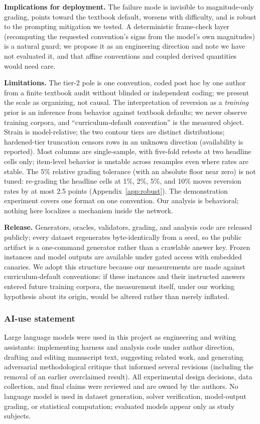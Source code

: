 \documentclass{article}
\begin{document}
\textbf{Implications for deployment.} The failure mode is invisible to magnitude-only grading, points toward the textbook
default, worsens with difficulty, and is robust to the prompting mitigation we
tested. A deterministic frame-check layer
(recomputing the requested convention's signs from the model's own magnitudes)
is a natural guard; we propose it as an engineering direction and note we have
not evaluated it, and that affine conventions and coupled derived quantities
would need care.

\textbf{Limitations.} The tier-2 pole is one convention, coded post hoc by one
author from a finite textbook audit without blinded or independent coding; we
present the scale as organizing, not causal. The interpretation of reversion as
a \emph{training} prior is an inference from behavior against textbook defaults;
we never observe training corpora, and ``curriculum-default convention'' is the
measured object. Strain is model-relative; the two contour tiers are distinct
distributions; hardened-tier truncation censors rows in an unknown direction
(availability is reported). Most columns are single-sample, with five-fold retests at two headline cells only;
item-level behavior is unstable across resamples even where rates are stable. The
5\% relative grading tolerance (with an absolute floor near zero) is not tuned:
re-grading the headline cells at 1\%, 2\%, 5\%, and 10\% moves reversion rates by
at most 2.5 points (Appendix~\ref{app:robust}). The demonstration experiment covers one
format on one convention. Our analysis is behavioral; nothing here localizes a
mechanism inside the network.

\textbf{Release.} Generators, oracles, validators, grading, and analysis code
are released publicly; every dataset regenerates byte-identically from a seed,
so the public artifact is a one-command generator rather than a crawlable answer
key. Frozen instances and model outputs are available under gated access with
embedded canaries. We adopt this structure because our measurements are made
against curriculum-default conventions: if these instances and their instructed
answers entered future training corpora, the measurement itself, under our
working hypothesis about its origin, would be altered rather than merely
inflated.

\subsubsection*{AI-use statement}
Large language models were used in this project as engineering and writing
assistants: implementing harness and analysis code under author direction,
drafting and editing manuscript text, suggesting related work, and generating
adversarial methodological critique that informed several revisions (including
the removal of an earlier overclaimed result). All experimental design decisions,
data collection, and final claims were reviewed and are owned by the authors. No
language model is used in dataset generation, solver verification, model-output
grading, or statistical computation; evaluated models appear only as study
subjects.
\end{document}
